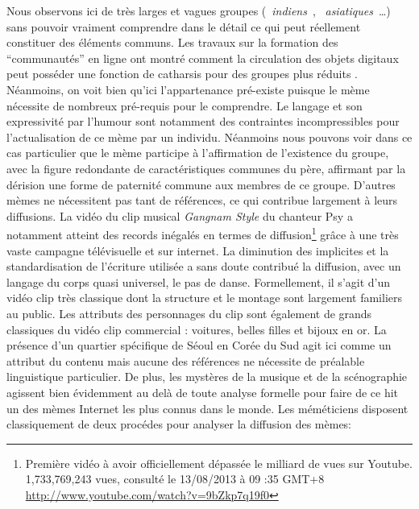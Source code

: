 Nous observons ici de tr\`es larges et vagues groupes ({\guillemotleft}~\textit{indiens}~{\guillemotright}, {\guillemotleft}~\textit{asiatiques}~{\guillemotright}{\dots}) sans pouvoir vraiment comprendre dans le d\'etail ce qui peut r\'eellement constituer des \'el\'ements communs. Les travaux sur la formation des {\textquotedblleft}communaut\'es{\textquotedblright} en ligne ont montr\'e comment la circulation des objets digitaux peut poss\'eder une fonction de catharsis pour des groupes plus r\'eduits \cite{Steyer2006}. N\'eanmoins, on voit bien qu{\textquoteright}ici l{\textquoteright}appartenance pr\'e-existe puisque le m\`eme n\'ecessite de nombreux pr\'e-requis pour le comprendre. Le langage et son expressivit\'e par l{\textquoteright}humour sont notamment des contraintes incompressibles pour l{\textquoteright}actualisation de ce m\`eme par un individu. N\'eanmoins nous pouvons voir dans ce cas particulier que le m\`eme participe \`a l{\textquoteright}affirmation de l{\textquoteright}existence du groupe, avec la figure redondante de caract\'eristiques communes du p\`ere, affirmant par la d\'erision une forme de paternit\'e commune aux membres de ce groupe. D{\textquoteright}autres m\`emes ne n\'ecessitent pas tant de r\'ef\'erences, ce qui contribue largement \`a leurs diffusions. La vid\'eo du clip musical \textit{Gangnam Style} du chanteur Psy a notamment atteint des records in\'egal\'es en termes de diffusion\footnote{ Premi\`ere vid\'eo \`a avoir officiellement d\'epass\'ee le milliard de vues sur Youtube. 1,733,769,243 vues, consult\'e le 13/08/2013 \`a 09 :35 GMT+8 \url{http://www.youtube.com/watch?v=9bZkp7q19f0}} gr\^ace \`a une tr\`es vaste campagne t\'el\'evisuelle et sur internet. La diminution des implicites et la standardisation de l{\textquoteright}\'ecriture utilis\'ee a sans doute contribu\'e la diffusion, avec un langage du corps quasi universel, le pas de danse. Formellement, il s{\textquoteright}agit d{\textquoteright}un vid\'eo clip tr\`es classique dont la structure et le montage sont largement familiers au public. Les attributs des personnages du clip sont \'egalement de grands classiques du vid\'eo clip commercial : voitures, belles filles et bijoux en or. La pr\'esence d{\textquoteright}un quartier sp\'ecifique de S\'eoul en Cor\'ee du Sud agit ici comme un attribut du contenu mais aucune des r\'ef\'erences ne n\'ecessite de pr\'ealable linguistique particulier. De plus, les myst\`eres de la musique et de la sc\'enographie agissent bien \'evidemment au del\`a de toute analyse formelle pour faire de ce hit un des m\`emes Internet les plus connus dans le monde. 
Les m\'em\'eticiens disposent classiquement de deux proc\'edes pour
analyser la diffusion des m\`emes: 

